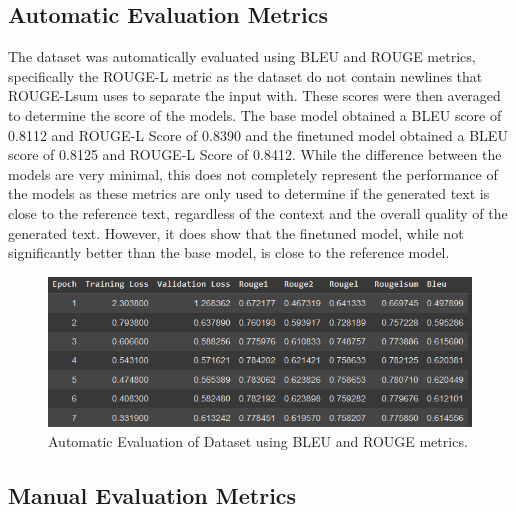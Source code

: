 \subsection{Automatic Evaluation Metrics}
The dataset was automatically evaluated using BLEU and ROUGE metrics, specifically the ROUGE-L metric as the dataset do not contain newlines that ROUGE-Lsum uses to separate the input with. These scores were then averaged to determine the score of the models. The base model obtained a BLEU score of 0.8112 and ROUGE-L Score of 0.8390 and the finetuned model obtained a BLEU score of 0.8125 and ROUGE-L Score of 0.8412. While the difference between the models are very minimal, this does not completely represent the performance of the models as these metrics are only used to determine if the generated text is close to the reference text, regardless of the context and the overall quality of the generated text. However, it does show that the finetuned model, while not significantly better than the base model, is close to the reference model.

\begin{figure}
	\caption{Automatic Evaluation of Dataset using BLEU and ROUGE metrics.}
	\centering
	\includegraphics[scale=0.6]{figures/AutomaticEvaluationMetrics.png}
\end{figure}

\subsection{Manual Evaluation Metrics}
